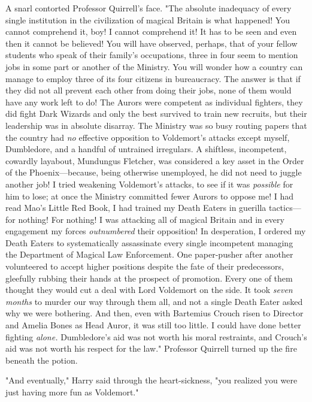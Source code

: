 A snarl contorted Professor Quirrell's face. "The absolute inadequacy of every
single institution in the civilization of magical Britain is what happened! You
cannot comprehend it, boy! I cannot comprehend it! It has to be seen and even
then it cannot be believed! You will have observed, perhaps, that of your
fellow students who speak of their family's occupations, three in four seem to
mention jobs in some part or another of the Ministry. You will wonder how a
country can manage to employ three of its four citizens in bureaucracy. The
answer is that if they did not all prevent each other from doing their jobs,
none of them would have any work left to do! The Aurors were competent as
individual fighters, they did fight Dark Wizards and only the best survived to
train new recruits, but their leadership was in absolute disarray. The Ministry
was so busy routing papers that the country had \emph{no} effective opposition
to Voldemort's attacks except myself, Dumbledore, and a handful of untrained
irregulars. A shiftless, incompetent, cowardly layabout, Mundungus Fletcher,
was considered a key asset in the Order of the Phoenix---because, being
otherwise unemployed, he did not need to juggle another job! I tried weakening
Voldemort's attacks, to see if it was \emph{possible} for him to lose; at once
the Ministry committed fewer Aurors to oppose me! I had read Mao's Little Red
Book, I had trained my Death Eaters in guerilla tactics---for nothing! For
nothing! I was attacking all of magical Britain and in every engagement my
forces \emph{outnumbered} their opposition! In desperation, I ordered my Death
Eaters to systematically assassinate every single incompetent managing the
Department of Magical Law Enforcement. One paper-pusher after another
volunteered to accept higher positions despite the fate of their predecessors,
gleefully rubbing their hands at the prospect of promotion. Every one of them
thought they would cut a deal with Lord Voldemort on the side. It took
\emph{seven months} to murder our way through them all, and not a single Death
Eater asked why we were bothering. And then, even with Bartemius Crouch risen
to Director and Amelia Bones as Head Auror, it was still too little. I could
have done better fighting \emph{alone.} Dumbledore's aid was not worth his
moral restraints, and Crouch's aid was not worth his respect for the law."
Professor Quirrell turned up the fire beneath the potion.

"And eventually," Harry said through the heart-sickness, "you realized you were
just having more fun as Voldemort."

